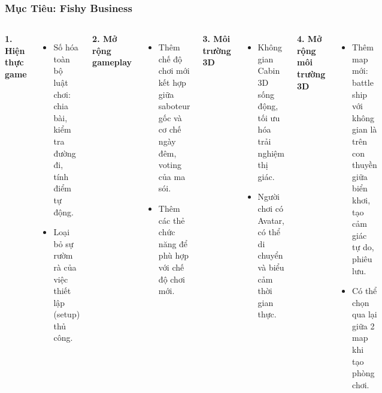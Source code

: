 \begin{frame}
\frametitle{Mục Tiêu: Fishy Business}
\begin{columns}
    \textbf{1. Hiện thực game}
    \begin{itemize}
        \item Số hóa toàn bộ luật chơi: chia bài, kiểm tra đường đi, tính điểm tự động.
        \item Loại bỏ sự rườm rà của việc thiết lập (setup) thủ công.
    \end{itemize}
    \vspace{0.8em} %
    \textbf{2. Mở rộng gameplay}
    \begin{itemize}
        \item Thêm chế độ chơi mới kết hợp giữa saboteur gốc và cơ chế ngày đêm, voting của ma sói.
        \item Thêm các thẻ chức năng để phù hợp với chế độ chơi mới.
    \end{itemize}

    \textbf{3. Môi trường 3D}
    \begin{itemize}
        \item Không gian Cabin 3D sống động, tối ưu hóa trải nghiệm thị giác.
        \item Người chơi có Avatar, có thể di chuyển và biểu cảm thời gian thực.
    \end{itemize}
    \vspace{0.8em} %
    \textbf{4. Mở rộng môi trường 3D}
    \begin{itemize}
        \item Thêm map mới: battle ship với không gian là trên con thuyền giữa biển khơi, tạo cảm giác tự do, phiêu lưu.
        \item Có thể chọn qua lại giữa 2 map khi tạo phòng chơi.
    \end{itemize}
\end{columns}
\end{frame}


